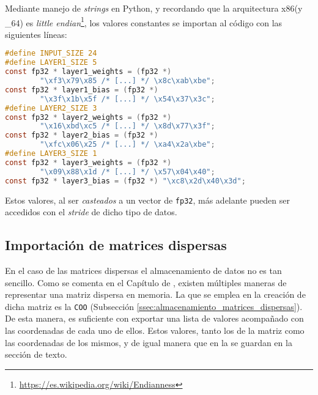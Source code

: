 Mediante manejo de \textit{strings} en Python, y recordando que la arquitectura x86(y \_64) es \textit{little endian}\footnote{\url{https://es.wikipedia.org/wiki/Endianness}}, los valores constantes se importan al código con las siguientes líneas:\medskip
\begin{lstlisting}[language=C]
#define INPUT_SIZE 24
#define LAYER1_SIZE 5
const fp32 * layer1_weights = (fp32 *)
        "\xf3\x79\x85 /* [...] */ \x8c\xab\xbe";
const fp32 * layer1_bias = (fp32 *)
        "\x3f\x1b\x5f /* [...] */ \x54\x37\x3c";
#define LAYER2_SIZE 3
const fp32 * layer2_weights = (fp32 *)
        "\x16\xbd\xc5 /* [...] */ \x8d\x77\x3f";
const fp32 * layer2_bias = (fp32 *)
        "\xfc\x06\x25 /* [...] */ \xa4\x2a\xbe";
#define LAYER3_SIZE 1
const fp32 * layer3_weights = (fp32 *)
        "\x09\x88\x1d /* [...] */ \x57\x04\x40";
const fp32 * layer3_bias = (fp32 *) "\xc8\x2d\x40\x3d";
\end{lstlisting}

Estos valores, al ser \textit{casteados} a un vector de \texttt{fp32}, más adelante pueden ser accedidos con el \textit{stride} de dicho tipo de datos.

\subsection{Importación de matrices dispersas}
\label{ssec:importacion_matrices_dispersas}
En el caso de las matrices dispersas el almacenamiento de datos no es tan sencillo. Como se comenta en el Capítulo de , existen múltiples maneras de representar una matriz dispersa en memoria. La que se emplea en la creación de dicha matriz es la \texttt{COO} (Subsección \ref{ssec:almacenamiento_matrices_dispersas}). De esta manera, es suficiente con exportar una lista de valores acompañado con las coordenadas de cada uno de ellos. Estos valores, tanto los de la matriz como las coordenadas de los mismos, y de igual manera que en la  se guardan en la sección de texto.

